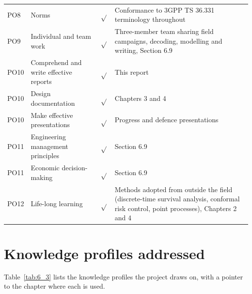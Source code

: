 \begin{table}[htbp]
\begin{tabularx}{\linewidth}{l >{\raggedright\arraybackslash}p{4.2cm} c X}
PO8 & Norms & $\sqrt{}$ & Conformance to 3GPP TS 36.331 terminology throughout \\
PO9 & Individual and team work & $\sqrt{}$ & Three-member team sharing field campaigns, decoding, modelling and writing, Section 6.9 \\
PO10 & Comprehend and write effective reports & $\sqrt{}$ & This report \\
PO10 & Design documentation & $\sqrt{}$ & Chapters 3 and 4 \\
PO10 & Make effective presentations & $\sqrt{}$ & Progress and defence presentations \\
PO11 & Engineering management principles & $\sqrt{}$ & Section 6.9 \\
PO11 & Economic decision-making & $\sqrt{}$ & Section 6.9 \\
PO12 & Life-long learning & $\sqrt{}$ & Methods adopted from outside the field (discrete-time survival analysis, conformal risk control, point processes), Chapters 2 and 4 \\
\bottomrule
\end{tabularx}
\end{table}


\section{Knowledge profiles addressed}
\label{sec:6_4}

Table~\ref{tab:6_3} lists the knowledge profiles the project draws on, with a pointer to the chapter where each is used.


